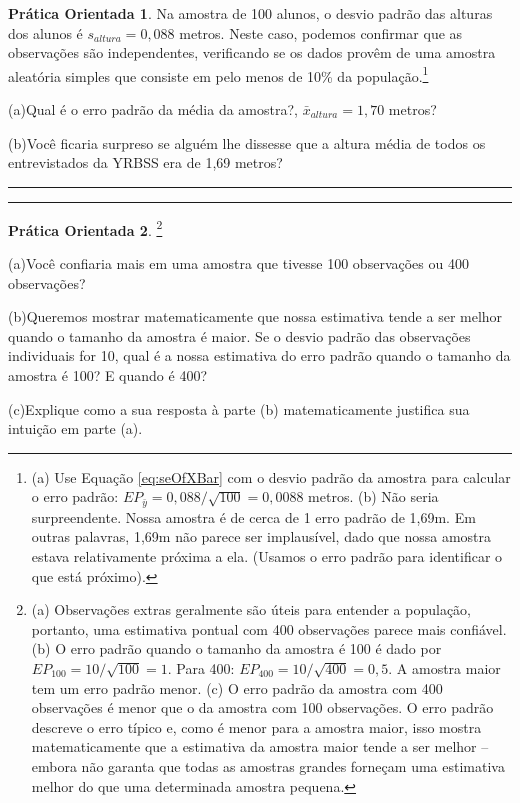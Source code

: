 \documentclass[
]{book}
\theoremstyle{definition}
\theoremstyle{definition}
\theoremstyle{definition}
\newtheorem{exercise}{Prática Orientada}[chapter]
\theoremstyle{definition}
\theoremstyle{remark}
\begin{document}
\begin{exercise}
\protect\hypertarget{exr:unnamed-chunk-152}{}{\label{exr:unnamed-chunk-152} }Na amostra de 100 alunos, o desvio padrão das alturas dos alunos é \(s_{altura} = 0,088\) metros. Neste caso, podemos confirmar que as observações são independentes, verificando se os dados provêm de uma amostra aleatória simples que consiste em pelo menos de 10\% da população.\footnote{(a) Use Equação \eqref{eq:seOfXBar} com o desvio padrão da amostra para calcular o erro padrão: \(EP_{\bar{y}} = 0,088 / \sqrt{100} = 0,0088\) metros. (b) Não seria surpreendente. Nossa amostra é de cerca de 1 erro padrão de 1,69m. Em outras palavras, 1,69m não parece ser implausível, dado que nossa amostra estava relativamente próxima a ela. (Usamos o erro padrão para identificar o que está próximo).}

(a)Qual é o erro padrão da média da amostra?, \(\bar{x}_{altura} = 1,70\) metros?

(b)Você ficaria surpreso se alguém lhe dissesse que a altura média de todos os entrevistados da YRBSS era de 1,69 metros?
\end{exercise}

\begin{center}\rule{0.5\linewidth}{0.5pt}\end{center}

\begin{center}\rule{0.5\linewidth}{0.5pt}\end{center}

\begin{exercise}
\protect\hypertarget{exr:unnamed-chunk-153}{}{\label{exr:unnamed-chunk-153} }\footnote{(a) Observações extras geralmente são úteis para entender a população, portanto, uma estimativa pontual com 400 observações parece mais confiável. (b) O erro padrão quando o tamanho da amostra é 100 é dado por \(EP_{100} = 10/\sqrt{100} = 1\). Para 400: \(EP_{400} = 10/\sqrt{400} = 0,5\). A amostra maior tem um erro padrão menor. (c) O erro padrão da amostra com 400 observações é menor que o da amostra com 100 observações. O erro padrão descreve o erro típico e, como é menor para a amostra maior, isso mostra matematicamente que a estimativa da amostra maior tende a ser melhor -- embora não garanta que todas as amostras grandes forneçam uma estimativa melhor do que uma determinada amostra pequena.}

(a)Você confiaria mais em uma amostra que tivesse 100 observações ou 400 observações?

(b)Queremos mostrar matematicamente que nossa estimativa tende a ser melhor quando o tamanho da amostra é maior. Se o desvio padrão das observações individuais for 10, qual é a nossa estimativa do erro padrão quando o tamanho da amostra é 100? E quando é 400?

(c)Explique como a sua resposta à parte (b) matematicamente justifica sua intuição em parte (a).
\end{exercise}
\end{document}
